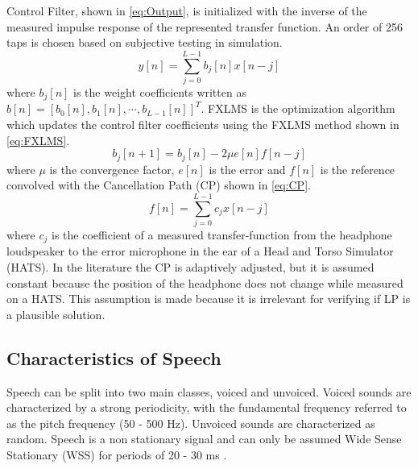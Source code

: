 Control Filter, shown in \autoref{eq:Output}, is initialized with the inverse of the measured impulse response of the represented transfer function. An order of 256 taps is chosen based on subjective testing in simulation.
\vspace{-3mm} %
\begin{equation}\label{eq:Output}
y[n]=\sum_{j=0}^{L-1}b_j[n]x[n-j]
\end{equation}
where $b_j[n]$ is the weight coefficients written as  $b[n]=[b_0[n],b_1[n], \cdots, b_{L-1}[n]]^T$. FXLMS is the optimization algorithm which updates the control filter coefficients using the FXLMS method shown in \autoref{eq:FXLMS}.
\begin{equation}\label{eq:FXLMS}
b_j[n+1] = b_j[n] - 2\mu e[n]f[n-j]
\end{equation}
where $\mu$ is the convergence factor, $e[n]$ is the error and $f[n]$ is the reference convolved with the Cancellation Path (CP) shown in \autoref{eq:CP}.
\begin{equation}\label{eq:CP}
f[n]=\sum_{j=0}^{L-1}c_jx[n-j]
\end{equation}
where $c_j$ is the coefficient of a measured transfer-function from the headphone loudspeaker to the error microphone in the ear of a Head and Torso Simulator (HATS). In the literature \cite{Hansen} the CP is adaptively adjusted, but it is assumed constant because the position of the headphone does not change while measured on a HATS. This assumption is made because it is irrelevant for verifying if LP is a plausible solution. 



\subsection{Characteristics of Speech}
Speech can be split into two main classes, voiced and unvoiced. Voiced sounds are characterized by a strong periodicity, with the fundamental frequency referred to as the pitch frequency (50 - 500 Hz). Unvoiced sounds are characterized as random. Speech is a non stationary signal and can only be assumed Wide Sense Stationary (WSS) for periods of 20 - 30 ms \cite{Speech}. 

